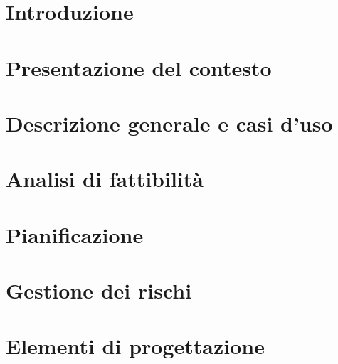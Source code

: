 

\def\DOCUMENTO 		{Piano di Progetto\\}
\def\VERSIONE 		{1.0.0\\}

\def\REDATTORI		{}

\def\VERIFICATORI	{}

\def\RESPONSABILE	{}

\def\USO			{}

\def\DISTRIBUZIONE	{\GRUPPO{}\\
					& \COMMITTENTE{}\\}

\def\DESCRIZIONE	{}

\def\INDICE		{true} 		%
\def\TABELLE	{true} 		%
\def\FIGURE		{true} 		%




\section{Introduzione}

\newpage

\section{Presentazione del contesto}

\newpage

\section{Descrizione generale e casi d'uso}

\newpage

\section{Analisi di fattibilità}

\newpage

\section{Pianificazione}

\newpage

\section{Gestione dei rischi}

\newpage

\section{Elementi di progettazione}



